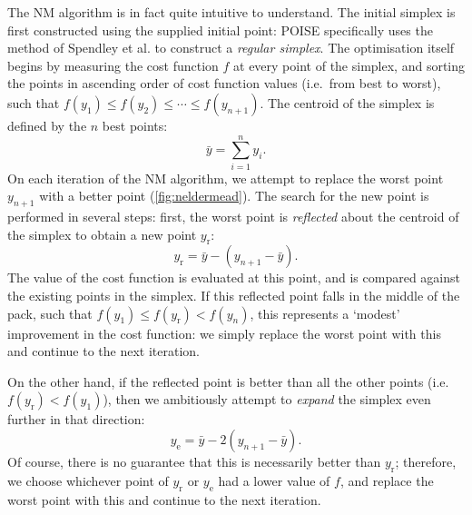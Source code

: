 The NM algorithm is in fact quite intuitive to understand.
The initial simplex is first constructed using the supplied initial point: POISE specifically uses the method of Spendley et al.\autocite{Spendley1962T} to construct a \textit{regular simplex}.
The optimisation itself begins by measuring the cost function $f$ at every point of the simplex, and sorting the points in ascending order of cost function values (i.e.\ from best to worst), such that $f(y_1) \leq f(y_2) \leq \cdots \leq f(y_{n+1})$.
The centroid of the simplex is defined by the $n$ best points:
\begin{equation}
    \label{eq:simplex_centroid}
    \bar{y} = \sum_{i=1}^n y_i.
\end{equation}
On each iteration of the NM algorithm, we attempt to replace the worst point $y_{n+1}$  with a better point (\cref{fig:neldermead}).
The search for the new point is performed in several steps: first, the worst point is \textit{reflected} about the centroid of the simplex to obtain a new point $y_\text{r}$:
\begin{equation}
    \label{eq:nm_reflect}
    y_\text{r} = \bar{y} - (y_{n+1} - \bar{y}).
\end{equation}
The value of the cost function is evaluated at this point, and is compared against the existing points in the simplex.
If this reflected point falls in the middle of the pack, such that $f(y_1) \leq f(y_\text{r}) < f(y_n)$, this represents a `modest' improvement in the cost function: we simply replace the worst point with this and continue to the next iteration.

On the other hand, if the reflected point is better than all the other points (i.e.\ $f(y_\text{r}) < f(y_1)$), then we ambitiously attempt to \textit{expand} the simplex even further in that direction:
\begin{equation}
    \label{eq:nm_expand}
    y_\text{e} = \bar{y} - 2(y_{n+1} - \bar{y}).
\end{equation}
Of course, there is no guarantee that this is necessarily better than $y_\text{r}$; therefore, we choose whichever point of $y_\text{r}$ or $y_\text{e}$ had a lower value of $f$, and replace the worst point with this and continue to the next iteration.

